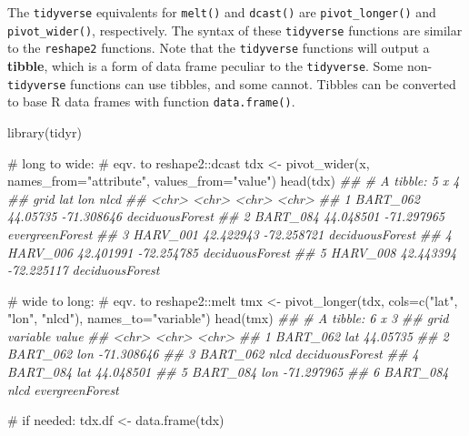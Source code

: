 \documentclass[
  13,
  letterpaper,
]{report}
\newenvironment{Shaded}{\begin{snugshade}}{\end{snugshade}}
\newcommand{\AttributeTok}[1]{\textcolor[rgb]{0.40,0.45,0.13}{#1}}
\newcommand{\CommentTok}[1]{\textcolor[rgb]{0.37,0.37,0.37}{#1}}
\newcommand{\DocumentationTok}[1]{\textcolor[rgb]{0.37,0.37,0.37}{\textit{#1}}}
\newcommand{\FunctionTok}[1]{\textcolor[rgb]{0.28,0.35,0.67}{#1}}
\newcommand{\NormalTok}[1]{\textcolor[rgb]{0.00,0.23,0.31}{#1}}
\newcommand{\OtherTok}[1]{\textcolor[rgb]{0.00,0.23,0.31}{#1}}
\newcommand{\StringTok}[1]{\textcolor[rgb]{0.13,0.47,0.30}{#1}}
\begin{document}
The \texttt{tidyverse} equivalents for \texttt{melt()} and
\texttt{dcast()} are \texttt{pivot\_longer()} and
\texttt{pivot\_wider()}, respectively. The syntax of these
\texttt{tidyverse} functions are similar to the \texttt{reshape2}
functions. Note that the \texttt{tidyverse} functions will output a
\textbf{tibble}, which is a form of data frame peculiar to the
\texttt{tidyverse}. Some non-\texttt{tidyverse} functions can use
tibbles, and some cannot. Tibbles can be converted to base R data frames
with function \texttt{data.frame()}.

\begin{Shaded}
\begin{Highlighting}[]

\FunctionTok{library}\NormalTok{(tidyr)}

\CommentTok{\# long to wide:}
\CommentTok{\# eqv. to reshape2::dcast}
\NormalTok{tdx }\OtherTok{\textless{}{-}} \FunctionTok{pivot\_wider}\NormalTok{(x, }
                   \AttributeTok{names\_from=}\StringTok{"attribute"}\NormalTok{,}
                   \AttributeTok{values\_from=}\StringTok{"value"}\NormalTok{)}
\FunctionTok{head}\NormalTok{(tdx)}
\DocumentationTok{\#\# \# A tibble: 5 x 4}
\DocumentationTok{\#\#   grid     lat       lon        nlcd           }
\DocumentationTok{\#\#   \textless{}chr\textgreater{}    \textless{}chr\textgreater{}     \textless{}chr\textgreater{}      \textless{}chr\textgreater{}          }
\DocumentationTok{\#\# 1 BART\_062 44.05735  {-}71.308646 deciduousForest}
\DocumentationTok{\#\# 2 BART\_084 44.048501 {-}71.297965 evergreenForest}
\DocumentationTok{\#\# 3 HARV\_001 42.422943 {-}72.258721 deciduousForest}
\DocumentationTok{\#\# 4 HARV\_006 42.401991 {-}72.254785 deciduousForest}
\DocumentationTok{\#\# 5 HARV\_008 42.443394 {-}72.225117 deciduousForest}

\CommentTok{\# wide to long:}
\CommentTok{\# eqv. to reshape2::melt}
\NormalTok{tmx }\OtherTok{\textless{}{-}} \FunctionTok{pivot\_longer}\NormalTok{(tdx,}
               \AttributeTok{cols=}\FunctionTok{c}\NormalTok{(}\StringTok{"lat"}\NormalTok{, }\StringTok{"lon"}\NormalTok{, }\StringTok{"nlcd"}\NormalTok{),}
               \AttributeTok{names\_to=}\StringTok{"variable"}\NormalTok{)}
\FunctionTok{head}\NormalTok{(tmx)}
\DocumentationTok{\#\# \# A tibble: 6 x 3}
\DocumentationTok{\#\#   grid     variable value          }
\DocumentationTok{\#\#   \textless{}chr\textgreater{}    \textless{}chr\textgreater{}    \textless{}chr\textgreater{}          }
\DocumentationTok{\#\# 1 BART\_062 lat      44.05735       }
\DocumentationTok{\#\# 2 BART\_062 lon      {-}71.308646     }
\DocumentationTok{\#\# 3 BART\_062 nlcd     deciduousForest}
\DocumentationTok{\#\# 4 BART\_084 lat      44.048501      }
\DocumentationTok{\#\# 5 BART\_084 lon      {-}71.297965     }
\DocumentationTok{\#\# 6 BART\_084 nlcd     evergreenForest}

\CommentTok{\# if needed:}
\NormalTok{tdx.df }\OtherTok{\textless{}{-}} \FunctionTok{data.frame}\NormalTok{(tdx)}
\end{Highlighting}
\end{Shaded}
\end{document}
